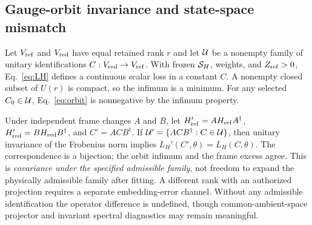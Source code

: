\documentclass[11pt]{article}
\begin{document}
\subsection{Gauge-orbit invariance and state-space mismatch}\label{supp:orbit}
Let $V_{\rm ref}$ and $V_{\rm red}$ have equal retained rank $r$ and let $\mathcal U$ be a nonempty family of unitary identifications $C:V_{\rm red}\to V_{\rm ref}$. With frozen $\mathcal S_H$, weights, and $Z_{\rm ref}>0$, Eq.~\eqref{eq:LH} defines a continuous scalar loss in a constant $C$. A nonempty closed subset of $U(r)$ is compact, so the infimum is a minimum. For any selected $C_0\in\mathcal U$, Eq.~\eqref{eq:orbit} is nonnegative by the infimum property.

Under independent frame changes $A$ and $B$, let $H'_{\rm ref}=AH_{\rm ref}A^\dagger$, $H'_{\rm red}=BH_{\rm red}B^\dagger$, and $C'=ACB^\dagger$. If $\mathcal U'=\{ACB^\dagger:C\in\mathcal U\}$, then unitary invariance of the Frobenius norm implies $L_H'(C',\theta)=L_H(C,\theta)$. The correspondence is a bijection; the orbit infimum and the frame excess agree. This is \emph{covariance under the specified admissible family}, not freedom to expand the physically admissible family after fitting. A different rank with an authorized projection requires a separate embedding-error channel. Without any admissible identification the operator difference is undefined, though common-ambient-space projector and invariant spectral diagnostics may remain meaningful.
\end{document}
